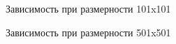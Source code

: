 \documentclass[a4paper,12pt]{article}
\begin{document}
\begin{figure}[H]
\caption{Зависимость при размерности 101x101}
\label{graphics:graphic1}
\end{figure}
\begin{figure}[pH]
\caption{Зависимость при размерности 501x501}
\label{graphics:graphic1}
\end{figure}

\newpage
\end{document}
